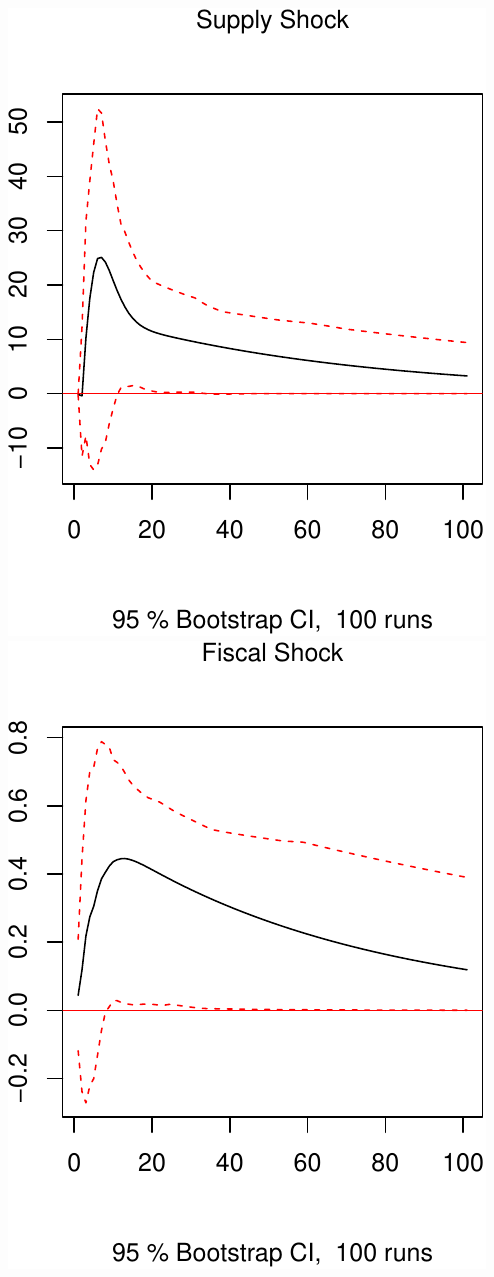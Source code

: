 \documentclass[11pt,preprint, authoryear]{elsarticle}
\numberwithin{equation}{section}
\numberwithin{figure}{section}
\numberwithin{table}{section}
\begin{document}
\includegraphics{TS_proj_files/figure-latex/unnamed-chunk-19-1.pdf}
\includegraphics{TS_proj_files/figure-latex/unnamed-chunk-19-2.pdf}
\end{document}
